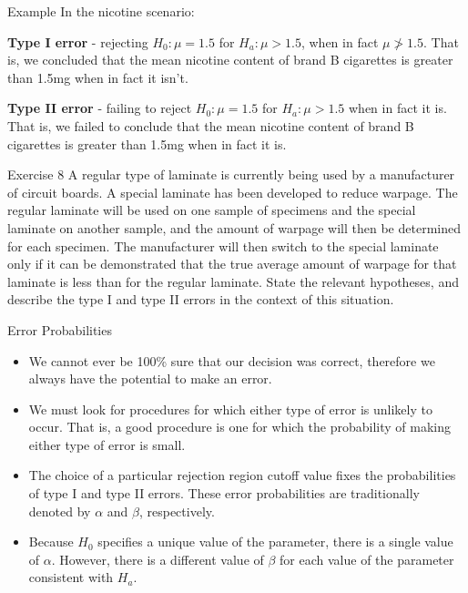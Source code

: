\documentclass[
  ignorenonframetext,
]{beamer}
\providecommand{\tightlist}{%
  \setlength{\itemsep}{0pt}\setlength{\parskip}{0pt}}\usepackage{longtable,booktabs,array}
\begin{document}
\begin{frame}{Example}
\protect\hypertarget{example-1}{}
In the nicotine scenario:

\textbf{Type I error} - rejecting \(H_{0}: \mu = 1.5\) for
\(H_{a}: \mu > 1.5\), when in fact \(\mu \ngtr 1.5\). That is, we
concluded that the mean nicotine content of brand B cigarettes is
greater than 1.5mg when in fact it isn't.

\textbf{Type II error} - failing to reject \(H_{0}: \mu = 1.5\) for
\(H_{a}: \mu > 1.5\) when in fact it is. That is, we failed to conclude
that the mean nicotine content of brand B cigarettes is greater than
1.5mg when in fact it is.
\end{frame}

\begin{frame}{Exercise 8}
\protect\hypertarget{exercise-8}{}
A regular type of laminate is currently being used by a manufacturer of
circuit boards. A special laminate has been developed to reduce warpage.
The regular laminate will be used on one sample of specimens and the
special laminate on another sample, and the amount of warpage will then
be determined for each specimen. The manufacturer will then switch to
the special laminate only if it can be demonstrated that the true
average amount of warpage for that laminate is less than for the regular
laminate. State the relevant hypotheses, and describe the type I and
type II errors in the context of this situation.
\end{frame}

\begin{frame}{Error Probabilities}
\protect\hypertarget{error-probabilities}{}
\begin{itemize}[<+->]
\tightlist
\item
  We cannot ever be 100\% sure that our decision was correct, therefore
  we always have the potential to make an error.
\item
  We must look for procedures for which either type of error is unlikely
  to occur. That is, a good procedure is one for which the probability
  of making either type of error is small.
\item
  The choice of a particular rejection region cutoff value fixes the
  probabilities of type I and type II errors. These error probabilities
  are traditionally denoted by \(\alpha\) and \(\beta\), respectively.
\item
  Because \(H_{0}\) specifies a unique value of the parameter, there is
  a single value of \(\alpha\). However, there is a different value of
  \(\beta\) for each value of the parameter consistent with \(H_{a}\).
\end{itemize}
\end{frame}
\end{document}

